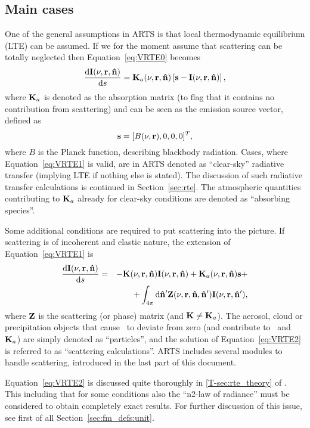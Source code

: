 \subsection{Main cases}
\label{sec:rteq:cases}
%
One of the general assumptions in ARTS is that local thermodynamic equilibrium
(LTE) can be assumed. If we for the moment assume that scattering can be
totally neglected then Equation~\ref{eq:VRTE0} becomes
\begin{equation}
  \label{eq:VRTE1}
  \frac{\mathrm{d}{\bf I}(\nu,{\bf r},{\bf \hat{n}})}{\mathrm{d} s} =
    {\bf K}_a(\nu,{\bf r},{\bf \hat{n}})\left[ \mathbf{s}- {\bf I}(\nu,{\bf r},{\bf \hat{n}})
    \right],
\end{equation}
where ${\bf K}_a$ is denoted as the absorption matrix (to flag that it contains
no contribution from scattering) and  can be seen as the emission
source vector, defined as
\begin{equation}
  \mathbf{s} = [B(\nu,{\bf r}),0,0,0]^T,
\end{equation}
where $B$ is the Planck function, describing blackbody radiation. Cases, where
Equation~\ref{eq:VRTE1} is valid, are in ARTS denoted as ``clear-sky''
radiative transfer (implying LTE if nothing else is stated). The discussion of
such radiative transfer calculations is continued in Section~\ref{sec:rte}. The
atmospheric quantities contributing to ${\bf K}_a$ already for clear-sky
conditions are denoted as ``absorbing species''.

Some additional conditions are required to put scattering into the picture. If
scattering is of incoherent and elastic nature, the extension of 
Equation~\ref{eq:VRTE1} is
\begin{eqnarray}
  \label{eq:VRTE2}
  \frac {\mathrm{d}{\bf I}(\nu,{\bf r},{\bf \hat{n}})}{\mathrm{d} s} &=&
    -{\bf K}(\nu,{\bf r},{\bf \hat{n}}) {\bf I}(\nu,{\bf r},{\bf \hat{n}}) +
    {\bf K}_a(\nu,{\bf r},{\bf \hat{n}})\mathbf{s} + \\ \nonumber
    &&+ \int_{4\pi} \mathrm{d}{\bf \hat{n}}' {\bf Z}(\nu,{\bf r},{\bf \hat{n}},{\bf \hat{n}}')
    {\bf I}(\nu,{\bf r},{\bf \hat{n}}'),
\end{eqnarray}
where ${\bf Z}$ is the scattering (or phase) matrix (and
${\bf K}\neq{\bf K}_a$). The aerosol, cloud or precipitation objects that
cause \PhaMat\ to deviate from zero (and contribute to \ExtMat\ and ${\bf K}_a$)
are simply denoted as ``particles'', and the solution of
Equation~\ref{eq:VRTE2} is referred to as ``scattering calculations''. ARTS
includes several modules to handle scattering, introduced in the last part of
this document.

Equation~\ref{eq:VRTE2} is discussed quite thoroughly in \ref{T-sec:rte_theory}
of \theory. This including that for some conditions also the ``n2-law of
radiance'' must be considered to obtain completely exact results. For further
discussion of this issue, see first of all Section~\ref{sec:fm_defs:unit}.




